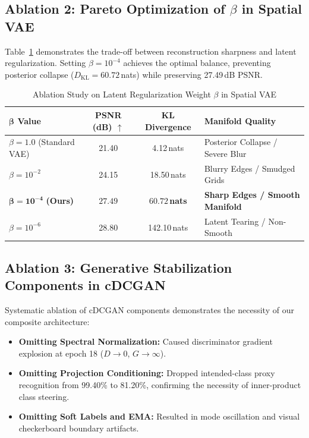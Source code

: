 \documentclass[journal]{IEEEtran}
\begin{document}
\subsection{Ablation 2: Pareto Optimization of $\beta$ in Spatial VAE}
Table~\ref{tab:ablation_beta} demonstrates the trade-off between reconstruction sharpness and latent regularization. Setting $\beta = 10^{-4}$ achieves the optimal balance, preventing posterior collapse ($D_{\text{KL}} = 60.72$\,nats) while preserving 27.49\,dB PSNR.

\begin{table}[htbp]
\caption{Ablation Study on Latent Regularization Weight $\beta$ in Spatial VAE}
\label{tab:ablation_beta}
\centering
\scriptsize
\renewcommand{\arraystretch}{1.2}
\setlength{\tabcolsep}{3pt}
\begin{tabularx}{\columnwidth}{@{}l c c >{\raggedright\arraybackslash}X@{}}
\toprule
$\boldsymbol{\beta}$ \textbf{Value} & \textbf{PSNR (dB)} $\uparrow$ & \textbf{KL Divergence} & \textbf{Manifold Quality} \\
\midrule
$\beta = 1.0$ (Standard VAE) & 21.40 & 4.12\,nats & Posterior Collapse / Severe Blur \\
$\beta = 10^{-2}$ & 24.15 & 18.50\,nats & Blurry Edges / Smudged Grids \\
$\boldsymbol{\beta = 10^{-4}}$ \textbf{(Ours)} & $\mathbf{27.49}$ & $\mathbf{60.72}$\,\textbf{nats} & \textbf{Sharp Edges / Smooth Manifold} \\
$\beta = 10^{-6}$ & 28.80 & 142.10\,nats & Latent Tearing / Non-Smooth \\
\bottomrule
\end{tabularx}
\end{table}

\subsection{Ablation 3: Generative Stabilization Components in cDCGAN}
Systematic ablation of cDCGAN components demonstrates the necessity of our composite architecture:
\begin{itemize}
    \item \textbf{Omitting Spectral Normalization:} Caused discriminator gradient explosion at epoch 18 ($D \to 0$, $G \to \infty$).
    \item \textbf{Omitting Projection Conditioning:} Dropped intended-class proxy recognition from 99.40\% to 81.20\%, confirming the necessity of inner-product class steering.
    \item \textbf{Omitting Soft Labels and EMA:} Resulted in mode oscillation and visual checkerboard boundary artifacts.
\end{itemize}
\end{document}
